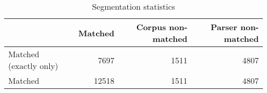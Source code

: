 \begin{table}[!ht]
\centering
\begin{tabular}{lrrr}
\toprule
{} &  Matched &  Corpus non-matched &  Parser non-matched \\
\midrule
Matched (exactly only) &     7697 &                1511 &                4807 \\
Matched                &    12518 &                1511 &                4807 \\
\bottomrule
\end{tabular}
\caption{Segmentation statistics}
\label{tab:segmentation-stats}
\end{table}
